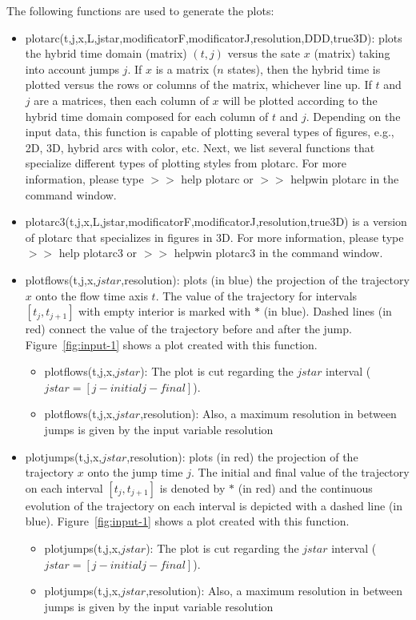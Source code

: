 \documentclass{article}
\begin{document}
\noindent The following functions are used to generate the plots:
\begin{itemize}
\item plotarc(t,j,x,L,jstar,modificatorF,modificatorJ,resolution,DDD,true3D): plots the hybrid time domain (matrix) $(t,j)$ versus the sate $x$  (matrix) taking into account jumps $j$. If $x$ is a matrix ($n$ states), then the hybrid time is plotted versus the rows or columns of the matrix, whichever line up. If $t$ and $j$ are a matrices, then each column of $x$ will be plotted according to the hybrid time domain composed for each column of $t$ and $j$. Depending on the input data, this function is capable of plotting several types of figures, e.g., 2D, 3D, hybrid arcs with color, etc. Next, we list several functions that specialize different types of plotting styles from plotarc. For more information, please type $>>$ help plotarc or $>>$ helpwin plotarc in the command window.
\item plotarc3(t,j,x,L,jstar,modificatorF,modificatorJ,resolution,true3D) is a version of plotarc that specializes in figures in 3D. For more information, please type $>>$ help plotarc3 or $>>$ helpwin plotarc3 in the command window.
\item plotflows(t,j,x,$jstar$,resolution): plots (in blue) the projection of the
  trajectory $x$ onto the flow time axis $t$.  The value of the
  trajectory for intervals $[t_j,t_{j+1}]$ with empty interior is
  marked with $*$ (in blue).  Dashed lines (in red) connect the value of the
  trajectory before and after the jump. 
  Figure~\ref{fig:input-1} shows a plot created with this function.
 \begin{itemize}
 	\item plotflows(t,j,x,$jstar$): The plot is cut regarding the $jstar$ interval ($jstar = [j-initial j-final]$).
	\item plotflows(t,j,x,$jstar$,resolution): Also, a maximum resolution in between jumps is given by the input variable resolution
 \end{itemize}
\item plotjumps(t,j,x,$jstar$,resolution): plots (in red) the projection of the
  trajectory $x$ onto the jump time $j$. The initial and final value
  of the trajectory on each interval $[t_j,t_{j+1}]$ is denoted by
  $*$ (in red) and the continuous evolution of the trajectory on
  each interval is depicted with a dashed line (in blue). Figure~\ref{fig:input-1} shows a plot created with this function.
 \begin{itemize}
 	\item plotjumps(t,j,x,$jstar$): The plot is cut regarding the $jstar$ interval ($jstar = [j-initial j-final]$).
	\item plotjumps(t,j,x,$jstar$,resolution): Also, a maximum resolution in between jumps is given by the input variable resolution
 \end{itemize}


\end{itemize}
\end{document}
